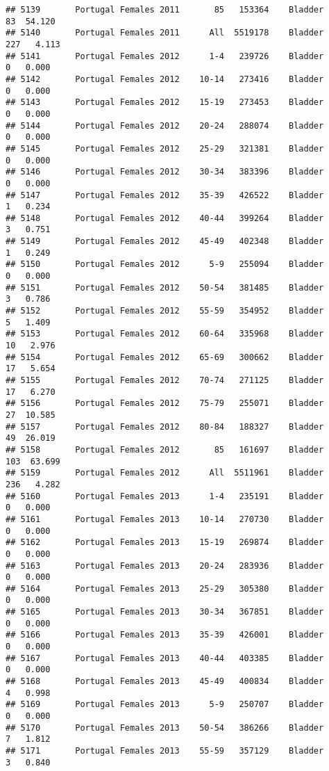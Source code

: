 \documentclass[
]{article}
\begin{document}
\begin{verbatim}
## 5139       Portugal Females 2011       85   153364    Bladder     83  54.120
## 5140       Portugal Females 2011      All  5519178    Bladder    227   4.113
## 5141       Portugal Females 2012      1-4   239726    Bladder      0   0.000
## 5142       Portugal Females 2012    10-14   273416    Bladder      0   0.000
## 5143       Portugal Females 2012    15-19   273453    Bladder      0   0.000
## 5144       Portugal Females 2012    20-24   288074    Bladder      0   0.000
## 5145       Portugal Females 2012    25-29   321381    Bladder      0   0.000
## 5146       Portugal Females 2012    30-34   383396    Bladder      0   0.000
## 5147       Portugal Females 2012    35-39   426522    Bladder      1   0.234
## 5148       Portugal Females 2012    40-44   399264    Bladder      3   0.751
## 5149       Portugal Females 2012    45-49   402348    Bladder      1   0.249
## 5150       Portugal Females 2012      5-9   255094    Bladder      0   0.000
## 5151       Portugal Females 2012    50-54   381485    Bladder      3   0.786
## 5152       Portugal Females 2012    55-59   354952    Bladder      5   1.409
## 5153       Portugal Females 2012    60-64   335968    Bladder     10   2.976
## 5154       Portugal Females 2012    65-69   300662    Bladder     17   5.654
## 5155       Portugal Females 2012    70-74   271125    Bladder     17   6.270
## 5156       Portugal Females 2012    75-79   255071    Bladder     27  10.585
## 5157       Portugal Females 2012    80-84   188327    Bladder     49  26.019
## 5158       Portugal Females 2012       85   161697    Bladder    103  63.699
## 5159       Portugal Females 2012      All  5511961    Bladder    236   4.282
## 5160       Portugal Females 2013      1-4   235191    Bladder      0   0.000
## 5161       Portugal Females 2013    10-14   270730    Bladder      0   0.000
## 5162       Portugal Females 2013    15-19   269874    Bladder      0   0.000
## 5163       Portugal Females 2013    20-24   283936    Bladder      0   0.000
## 5164       Portugal Females 2013    25-29   305380    Bladder      0   0.000
## 5165       Portugal Females 2013    30-34   367851    Bladder      0   0.000
## 5166       Portugal Females 2013    35-39   426001    Bladder      0   0.000
## 5167       Portugal Females 2013    40-44   403385    Bladder      0   0.000
## 5168       Portugal Females 2013    45-49   400834    Bladder      4   0.998
## 5169       Portugal Females 2013      5-9   250707    Bladder      0   0.000
## 5170       Portugal Females 2013    50-54   386266    Bladder      7   1.812
## 5171       Portugal Females 2013    55-59   357129    Bladder      3   0.840

\end{verbatim}
\end{document}
